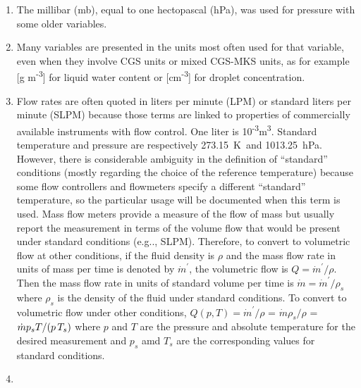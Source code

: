 \documentclass[
  english,
]{book}
\providecommand{\tightlist}{%
  \setlength{\itemsep}{0pt}\setlength{\parskip}{0pt}}
\begin{document}
\begin{enumerate}
\def\labelenumi{\arabic{enumi}.}
\tightlist
\item
  The millibar (mb), equal to one hectopascal (hPa), was used for pressure with some older variables.\\
\item
  Many variables are presented in the units most often used for that variable, even when they involve CGS units or mixed CGS-MKS units, as for example {[}g m\textsuperscript{-3}{]} for liquid water content or
  {[}cm\textsuperscript{-3}{]} for droplet concentration.\\
\item
  Flow rates are often quoted in liters per minute (LPM) or standard liters per minute (SLPM) because those terms are linked to properties of commercially available instruments with flow control. One liter is 10\textsuperscript{-3}m\textsuperscript{3}. Standard temperature and pressure are respectively 273.15~K~and 1013.25~hPa. However, there is considerable ambiguity in the definition of ``standard'' conditions (mostly regarding the choice of the reference temperature) because some flow controllers and flowmeters specify a different ``standard'' temperature, so the particular usage will be documented when this term is used. Mass flow meters provide a measure of the flow of mass but usually report the measurement in terms of the volume flow that would be present under standard conditions (e.g.., SLPM). Therefore, to convert to volumetric flow at other conditions, if the fluid density is \(\rho\) and the mass flow rate in units of mass per time is denoted by \(\dot{m}^\prime\), the volumetric flow is \(Q=\dot{m}^\prime/\rho\). Then the mass flow rate in units of standard volume per time is \(\dot{m}=\dot{m}^\prime/\rho_s\) where \(\rho_s\) is the density of the fluid under standard conditions. To convert to volumetric flow under other conditions, \(Q(p,T)=\dot{m}^\prime/\rho\) = \(\dot{m}\rho_s/\rho\) = \(\dot{m}p_{s}T/(p\thinspace T_{s})\) where \(p\) and \(T\) are the pressure and absolute temperature for the desired measurement and \(p_s\) amd \(T_s\) are the corresponding values for standard conditions.\\
\item

\end{enumerate}
\end{document}
